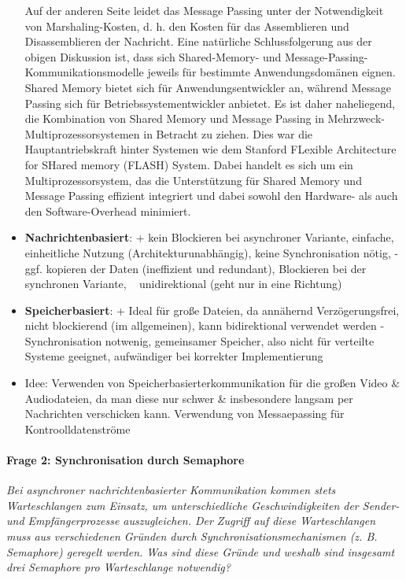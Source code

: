 \documentclass[a4paper]{article}
\begin{document}
\begin{itemize}
          Auf der anderen Seite leidet das Message Passing unter der Notwendigkeit von Marshaling-Kosten, d. h. den Kosten für das Assemblieren und Disassemblieren der Nachricht.
          Eine natürliche Schlussfolgerung aus der obigen Diskussion ist, dass sich Shared-Memory- und Message-Passing-Kommunikationsmodelle jeweils für bestimmte Anwendungsdomänen eignen. Shared Memory bietet sich für Anwendungsentwickler an, während Message Passing sich für Betriebssystementwickler anbietet.
          Es ist daher naheliegend, die Kombination von Shared Memory und Message Passing in Mehrzweck-Multiprozessorsystemen in Betracht zu ziehen. Dies war die Hauptantriebskraft hinter Systemen wie dem Stanford FLexible Architecture for SHared memory (FLASH) System. Dabei handelt es sich um ein Multiprozessorsystem, das die Unterstützung für Shared Memory und Message Passing effizient integriert und dabei sowohl den Hardware- als auch den Software-Overhead minimiert.
    \item \textbf{Nachrichtenbasiert}:  + kein Blockieren bei asynchroner Variante, einfache, einheitliche Nutzung (Architekturunabhängig), keine Synchronisation nötig, - ggf. kopieren der Daten (ineffizient und redundant), Blockieren bei der synchronen Variante, ~ unidirektional (geht nur in eine Richtung)
    \item \textbf{Speicherbasiert}: + Ideal für große Dateien, da annähernd Verzögerungsfrei, nicht blockierend (im allgemeinen), kann bidirektional verwendet werden - Synchronisation notwenig, gemeinsamer Speicher, also nicht für verteilte Systeme geeignet, aufwändiger bei korrekter Implementierung
    \item Idee: Verwenden von Speicherbasierterkommunikation für die großen Video \& Audiodateien, da man diese nur schwer \& insbesondere langsam per Nachrichten verschicken kann. Verwendung von Messaepassing für Kontroolldatenströme
\end{itemize}

\vspace{10mm}
\paragraph{Frage 2: Synchronisation durch Semaphore}
\textit{Bei asynchroner nachrichtenbasierter Kommunikation kommen stets Warteschlangen zum Einsatz, um unterschiedliche Geschwindigkeiten der Sender- und Empfängerprozesse auszugleichen. Der Zugriff auf diese Warteschlangen muss aus verschiedenen Gründen durch Synchronisationsmechanismen (z. B. Semaphore) geregelt werden. Was sind diese Gründe und weshalb sind insgesamt drei Semaphore pro Warteschlange notwendig?}
\end{document}
